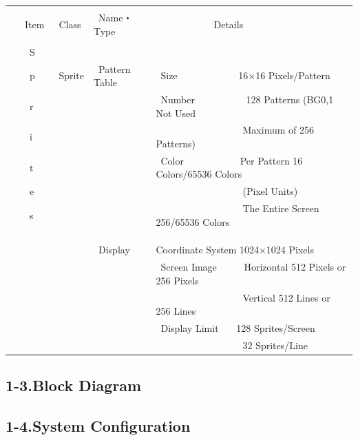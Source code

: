 ﻿\documentclass[twoside,a4paper,12pt]{article}
\begin{document}
\begin{tabular}{|p{17mm}|p{20mm}|p{27mm}|p{100mm}|}
\hline
& & &\\
\ \ \ Item & \ Class & \ Name・Type & \ \ \ \ \ \ \ \ \ \ \ \ Details\\[1mm]
\hline
& & &\\[-3mm]
\ \ \ \ S & & &\\[3mm]
\ \ \ \ p & \ Sprite & \ Pattern Table & \ Size \ \ \ \ \ \ \ \ \ \ \ \ 16×16 Pixels/Pattern\\[3mm]
\ \ \ \ r & & & \ Number \ \ \ \ \ \ \ \ \ \ 128 Patterns (BG0,1 Not Used\\[3mm]
\ \ \ \ i & & & \ \ \ \ \ \ \ \ \ \ \ \ \ \ \ \ \ \ Maximum of 256 Patterns)\\[3mm]
\ \ \ \ t & & & \ Color \ \ \ \ \ \ \ \ \ \ \ Per Pattern 16 Colors/65536 Colors\\[3mm]
\ \ \ \ e & & & \ \ \ \ \ \ \ \ \ \ \ \ \ \ \ \ \ \ (Pixel Units)\\[3mm]
\ \ \ \ s & & & \ \ \ \ \ \ \ \ \ \ \ \ \ \ \ \ \ \ The Entire Screen 256/65536 Colors\\
& & &\\
& & &\\
\cline{3-4}
& & &\\[-2mm]
& & \ Display & Coordinate System 1024×1024 Pixels\\[3mm]
& & & \ Screen Image \ \ \ \ \ Horizontal 512 Pixels or 256 Pixels\\[3mm]
& & & \ \ \ \ \ \ \ \ \ \ \ \ \ \ \ \ \ \ Vertical 512 Lines or 256 Lines\\[3mm]
& & & \ Display Limit \ \ \ 128 Sprites/Screen\\[3mm]
& & & \ \ \ \ \ \ \ \ \ \ \ \ \ \ \ \ \ \ 32 Sprites/Line\\
\hline
\end{tabular}

\newpage

\subsection*{1-3.Block Diagram}

\newpage

\subsection*{1-4.System Configuration}
\end{document}
